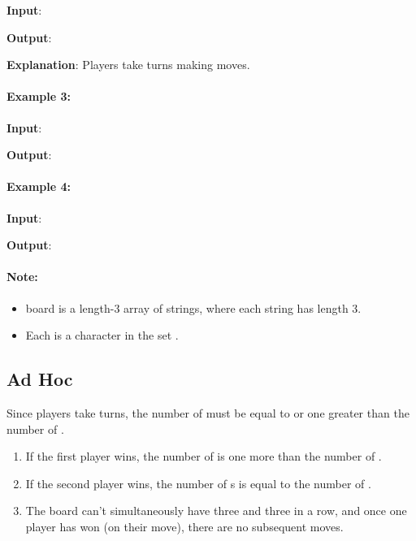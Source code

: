 \begin{flushleft}
\textbf{Input}: 

\textbf{Output}: 

\textbf{Explanation}: Players take turns making moves.
\end{flushleft}

\paragraph{Example 3:}

\begin{flushleft}
\textbf{Input}: 

\textbf{Output}: 
\end{flushleft}

\paragraph{Example 4:}

\begin{flushleft}
\textbf{Input}: 

\textbf{Output}: 
\end{flushleft}

\paragraph{Note:}

\begin{itemize}
\item board is a length-3 array of strings, where each string  has length 3.
\item Each  is a character in the set \fcj{[" ", "X", "O"]}.
\end{itemize}

\subsection{Ad Hoc}
Since players take turns, the number of  must be equal to or one greater than the number of .

\begin{enumerate}
\item If the first player wins, the number of  is one more than the number of .

\item If the second player wins, the number of s is equal to the number of .

\item The board can't simultaneously have three  and three  in a row, and once one player has won (on their move), there are no subsequent moves.
\end{enumerate}


